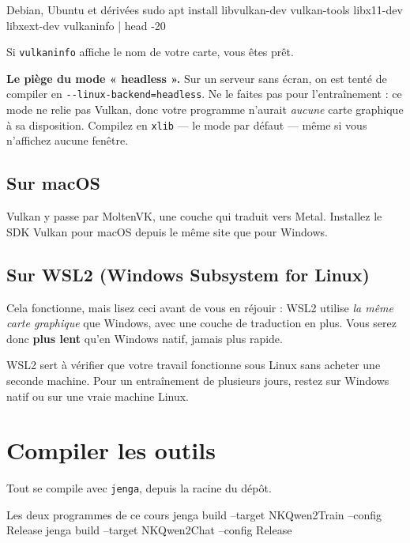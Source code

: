 \begin{nkcode}[]{Debian, Ubuntu et dérivées}
sudo apt install libvulkan-dev vulkan-tools libx11-dev libxext-dev
vulkaninfo | head -20
\end{nkcode}

Si \texttt{vulkaninfo} affiche le nom de votre carte, vous êtes prêt.

\begin{nkpiege}
\textbf{Le piège du mode « headless ».} Sur un serveur sans écran, on est tenté
de compiler en \texttt{-{}-linux-backend=headless}. Ne le faites pas pour
l'entraînement : ce mode ne relie pas Vulkan, donc votre programme n'aurait
\emph{aucune} carte graphique à sa disposition. Compilez en \texttt{xlib} — le
mode par défaut — même si vous n'affichez aucune fenêtre.
\end{nkpiege}

\subsection{Sur macOS}

Vulkan y passe par MoltenVK, une couche qui traduit vers Metal. Installez le SDK
Vulkan pour macOS depuis le même site que pour Windows.

\subsection{Sur WSL2 (Windows Subsystem for Linux)}

Cela fonctionne, mais lisez ceci avant de vous en réjouir : WSL2 utilise
\emph{la même carte graphique} que Windows, avec une couche de traduction en
plus. Vous serez donc \textbf{plus lent} qu'en Windows natif, jamais plus
rapide.

WSL2 sert à vérifier que votre travail fonctionne sous Linux sans acheter une
seconde machine. Pour un entraînement de plusieurs jours, restez sur Windows
natif ou sur une vraie machine Linux.

\section{Compiler les outils}

Tout se compile avec \texttt{jenga}, depuis la racine du dépôt.

\begin{nkcode}[]{Les deux programmes de ce cours}
jenga build --target NKQwen2Train --config Release
jenga build --target NKQwen2Chat  --config Release
\end{nkcode}

